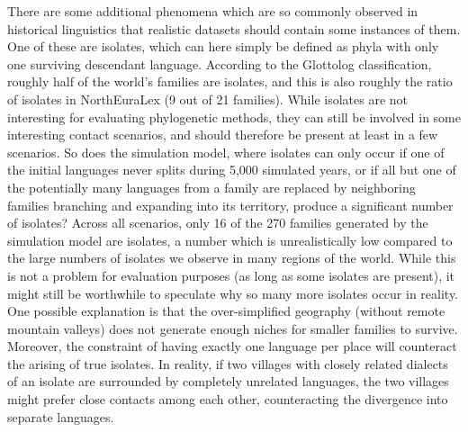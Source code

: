 There are some additional phenomena which are so commonly observed in historical linguistics that realistic datasets should contain some instances of them. One of these are isolates, which can here simply be defined as phyla with only one surviving descendant language. According to the Glottolog classification, roughly half of the world's families are isolates, and this is also roughly the ratio of isolates in NorthEuraLex (9 out of 21 families). While isolates are not interesting for evaluating phylogenetic methods, they can still be involved in some interesting contact scenarios, and should therefore be present at least in a few scenarios. So does the simulation model, where isolates can only occur if one of the initial languages never splits during 5,000 simulated years, or if all but one of the potentially many languages from a family are replaced by neighboring families branching and expanding into its territory, produce a significant number of isolates? Across all scenarios, only 16 of the 
270 families generated by the simulation model are isolates, a number which is unrealistically low compared to the large numbers of isolates we observe in many regions of the world. While this is not a problem for evaluation purposes (as long as some isolates are present), it might still be worthwhile to speculate why so many more isolates occur in reality. One possible explanation is that the over-simplified geography (without remote mountain valleys) does not generate enough niches for smaller families to survive. Moreover, the constraint of having exactly one language per place will counteract the arising of true isolates. In reality, if two villages with closely related dialects of an isolate are surrounded by completely unrelated languages, the two villages might prefer close contacts among each other, counteracting the divergence into separate languages.

